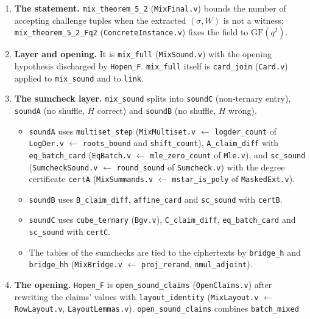 \documentclass[11pt,a4paper]{article}
\theoremstyle{definition}
\theoremstyle{plain}
\begin{document}
\begin{enumerate}[leftmargin=1.6em,itemsep=2pt]
\item \textbf{The statement.} \texttt{mix\_theorem\_5\_2} (\texttt{MixFinal.v}) bounds the number of
  accepting challenge tuples when the extracted $(\sigma,W)$ is not a witness;
  \texttt{mix\_theorem\_5\_2\_Fq2} (\texttt{ConcreteInstance.v}) fixes the field to $\mathrm{GF}(q^2)$.
\item \textbf{Layer and opening.} It is \texttt{mix\_full} (\texttt{MixSound.v}) with the opening hypothesis
  discharged by \texttt{Hopen\_F}. \texttt{mix\_full} itself is \texttt{card\_join} (\texttt{Card.v}) applied to
  \texttt{mix\_sound} and to \texttt{link}.
\item \textbf{The sumcheck layer.} \texttt{mix\_sound} splits into \texttt{soundC} (non-ternary entry),
  \texttt{soundA} (no shuffle, $H$ correct) and \texttt{soundB} (no shuffle, $H$ wrong).
  \begin{itemize}[leftmargin=1.2em]
  \item \texttt{soundA} uses \texttt{multiset\_step} (\texttt{MixMultiset.v} $\leftarrow$
    \texttt{logder\_count} of \texttt{LogDer.v} $\leftarrow$ \texttt{roots\_bound} and \texttt{shift\_count}),
    \texttt{A\_claim\_diff} with \texttt{eq\_batch\_card} (\texttt{EqBatch.v} $\leftarrow$
    \texttt{mle\_zero\_count} of \texttt{Mle.v}), and \texttt{sc\_sound} (\texttt{SumcheckSound.v} $\leftarrow$
    \texttt{round\_sound} of \texttt{Sumcheck.v}) with the degree certificate \texttt{certA}
    (\texttt{MixSummands.v} $\leftarrow$ \texttt{mstar\_is\_poly} of \texttt{MaskedExt.v}).
  \item \texttt{soundB} uses \texttt{B\_claim\_diff}, \texttt{affine\_card} and \texttt{sc\_sound} with
    \texttt{certB}.
  \item \texttt{soundC} uses \texttt{cube\_ternary} (\texttt{Bgv.v}), \texttt{C\_claim\_diff}, \texttt{eq\_batch\_card}
    and \texttt{sc\_sound} with \texttt{certC}.
  \item The tables of the sumchecks are tied to the ciphertexts by \texttt{bridge\_h} and
    \texttt{bridge\_hh} (\texttt{MixBridge.v} $\leftarrow$ \texttt{proj\_rerand}, \texttt{nmul\_adjoint}).
  \end{itemize}
\item \textbf{The opening.} \texttt{Hopen\_F} is \texttt{open\_sound\_claims} (\texttt{OpenClaims.v}) after
  rewriting the claims' values with \texttt{layout\_identity} (\texttt{MixLayout.v} $\leftarrow$
  \texttt{RowLayout.v}, \texttt{LayoutLemmas.v}). \texttt{open\_sound\_claims} combines \texttt{batch\_mixed}

\end{enumerate}
\end{document}
